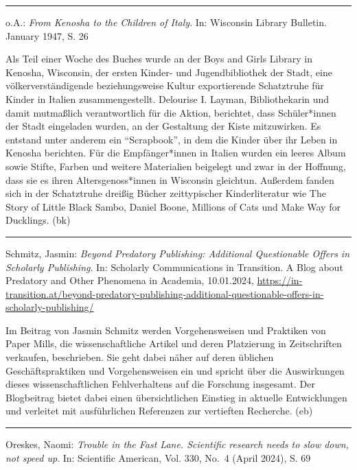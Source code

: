 \documentclass[a4paper,
fontsize=11pt,
oneside,
numbers=noperiodatend,
parskip=half-,
bibliography=totoc,
final
]{scrartcl}
\begin{document}
\begin{center}\rule{0.5\linewidth}{0.5pt}\end{center}

o.A.: \emph{From Kenosha to the Children of Italy}. In: Wisconsin
Library Bulletin. January 1947, S. 26

Als Teil einer Woche des Buches wurde an der Boys and Girls Library in
Kenosha, Wisconsin, der ersten Kinder- und Jugendbibliothek der Stadt,
eine völkerverständigende beziehungsweise Kultur exportierende
Schatztruhe für Kinder in Italien zusammengestellt. Delourise I. Layman,
Bibliothekarin und damit mutmaßlich verantwortlich für die Aktion,
berichtet, dass Schüler*innen der Stadt eingeladen wurden, an der
Gestaltung der Kiste mitzuwirken. Es entstand unter anderem ein
\enquote{Scrapbook}, in dem die Kinder über ihr Leben in Kenosha
berichten. Für die Empfänger*innen in Italien wurden ein leeres Album
sowie Stifte, Farben und weitere Materialien beigelegt und zwar in der
Hoffnung, dass sie es ihren Altersgenoss*innen in Wisconsin gleichtun.
Außerdem fanden sich in der Schatztruhe dreißig Bücher zeittypischer
Kinderliteratur wie The Story of Little Black Sambo, Daniel Boone,
Millions of Cats und Make Way for Ducklings. (bk)

\begin{center}\rule{0.5\linewidth}{0.5pt}\end{center}

Schmitz, Jasmin: \emph{Beyond Predatory Publishing: Additional
Questionable Offers in Scholarly Publishing}. In: Scholarly
Communications in Transition. A Blog about Predatory and Other Phenomena
in Academia, 10.01.2024,
\url{https://in-transition.at/beyond-predatory-publishing-additional-questionable-offers-in-scholarly-publishing/}

Im Beitrag von Jasmin Schmitz werden Vorgehensweisen und Praktiken von
Paper Mills, die wissenschaftliche Artikel und deren Platzierung in
Zeitschriften verkaufen, beschrieben. Sie geht dabei näher auf deren
üblichen Geschäftspraktiken und Vorgehensweisen ein und spricht über die
Auswirkungen dieses wissenschaftlichen Fehlverhaltens auf die Forschung
insgesamt. Der Blogbeitrag bietet dabei einen übersichtlichen Einstieg
in aktuelle Entwicklungen und verleitet mit ausführlichen Referenzen zur
vertieften Recherche. (eb)

\begin{center}\rule{0.5\linewidth}{0.5pt}\end{center}

Oreskes, Naomi: \emph{Trouble in the Fast Lane. Scientific research
needs to slow down, not speed up}. In: Scientific American, Vol. 330,
No.~4 (April 2024), S. 69
\end{document}
